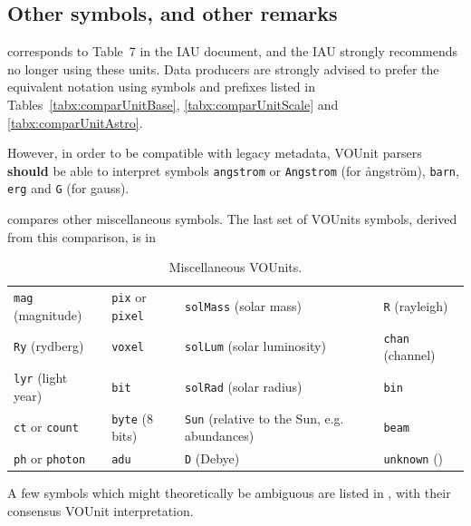 \documentclass[11pt,notitlepage,onecolumn]{ivoa}
\newcommand*\norm[1]{\textbf{\color{ivoacolor}#1}}
\newcommand{\unit}[1]{\texttt{\small\color{orange}#1}}
\begin{document}
\subsection{Other symbols, and other remarks}
\label{sec:other}

 corresponds to Table~7 in the IAU document, and the IAU strongly
recommends no longer using these units. 
Data producers are strongly advised to prefer the equivalent notation using symbols and prefixes listed in 
Tables~\ref{tabx:comparUnitBase}, \ref{tabx:comparUnitScale} and \ref{tabx:comparUnitAstro}. 

However, in order to be compatible with legacy metadata, VOUnit
parsers \norm{should} be able to interpret symbols \unit{angstrom}
or \unit{Angstrom} (for \aa{}ngstr\"om), \unit{barn}, \unit{erg}
and \unit{G} (for gauss).

 compares other miscellaneous symbols. 
The last set of VOUnits symbols, derived from this comparison, is in

\begin{table}[ht]
\begin{center}
\def\arraystretch{1.2}
\begin{tabular}{|l|l|L{3cm}|l|}\hline
\unit{mag} (magnitude)		&\unit{pix}  or \unit{pixel} 	&\unit{solMass} (solar mass)     &\unit{R} (rayleigh) \\
\unit{Ry} (rydberg)		&\unit{voxel}    		&\unit{solLum} (solar luminosity)&\unit{chan} (channel) 	\\
\unit{lyr} (light year)		&\unit{bit}   			&\unit{solRad} (solar radius)	&\unit{bin} \\
\unit{ct} or \unit{count}	&\unit{byte} (8 bits)   	&\unit{Sun} (relative to the Sun, e.g. abundances)&\unit{beam} 	\\
\unit{ph} or \unit{photon} 	&\unit{adu}                     &\unit{D} (Debye)	&\unit{unknown} ()\\\hline
\end{tabular}
\end{center}
\caption[Miscellaneous VOUnits]
{\label{tab:voumisc}Miscellaneous VOUnits.}
\end{table}

A few symbols which might theoretically be ambiguous are listed in
,
with their consensus VOUnit interpretation.
\end{document}
